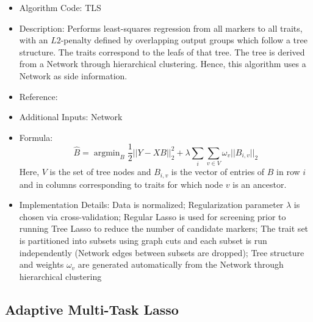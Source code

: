 \documentclass{article}
\newcommand{\argmin}{\operatorname{argmin}}
\begin{document}
\begin{itemize}
\item Algorithm Code: TLS
\item Description: Performs least-squares regression from all markers to all traits, with an $L2$-penalty defined by overlapping output groups which follow a tree structure. The traits correspond to the leafs of that tree. The tree is derived from a Network through hierarchical clustering. Hence, this algorithm uses a Network as side information.
\item Reference: \cite{TreeLasso}
\item Additional Inputs: Network
\item Formula:
\begin{equation*}
\hat{B} = \argmin_{B} \frac{1}{2}||Y - XB||_2^2 + \lambda \sum_i \sum_{v \in V} \omega_v ||B_{i,v}||_2
\end{equation*}
Here, $V$ is the set of tree nodes and $B_{i,v}$ is the vector of entries of $B$ in row $i$ and in columns corresponding to traits for which node $v$ is an ancestor.
\item Implementation Details: Data is normalized; Regularization parameter $\lambda$ is chosen via cross-validation; Regular Lasso is used for screening prior to running Tree Lasso to reduce the number of candidate markers; The trait set is partitioned into subsets using graph cuts and each subset is run independently (Network edges between subsets are dropped); Tree structure and weights $\omega_v$ are generated automatically from the Network through hierarchical clustering
\end{itemize}

\subsection{Adaptive Multi-Task Lasso}
\end{document}
